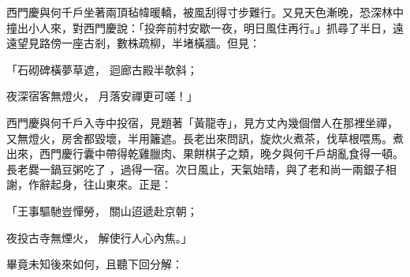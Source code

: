 西門慶與何千戶坐著兩頂毡幃暖轎，被風刮得寸步難行。又見天色漸晚，恐深林中撞出小人來，對西門慶說：「投奔前村安歇一夜，明日風住再行。」抓尋了半日，遠遠望見路傍一座古剎，數株疏柳，半堵橫牆。但見：

「石砌碑橫夢草遮，  迴廊古殿半欹斜；

夜深宿客無燈火，  月落安禪更可嗟！」

西門慶與何千戶入寺中投宿，見題著「黃龍寺」，見方丈內幾個僧人在那裡坐禪，又無燈火，房舍都毀壞，半用籬遮。長老出來問訊，旋炊火煮茶，伐草根喂馬。煮出來，西門慶行囊中帶得乾雞臘肉、果餅棋子之類，晚夕與何千戶胡亂食得一頓。長老爨一鍋豆粥吃了 ，過得一宿。次日風止，天氣始晴，與了老和尚一兩銀子相謝，作辭起身，往山東來。正是：

「王事驅馳豈憚勞，  關山迢遞赴京朝；

夜投古寺無煙火，  解使行人心內焦。」

畢竟未知後來如何，且聽下回分解：


